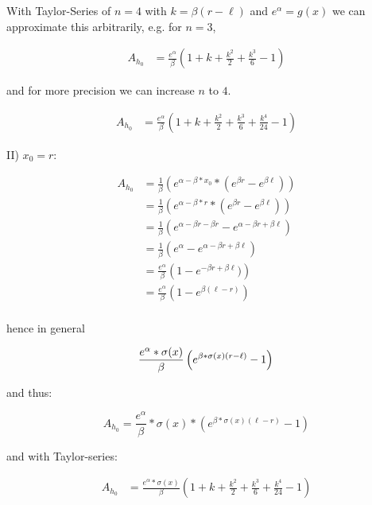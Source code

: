 With Taylor-Series of $n = 4$ with $k = \beta (r - \ell)$ and $e^{\alpha} = g(x)$ we can approximate this arbitrarily,
e.g. for $n = 3$,

\begin{align*}
	A_{h_0} &= \frac{e^{\alpha}}{\beta} \left(1 + k + \frac{k^2}{2} +  \frac{k^3}{6} - 1 \right)
\end{align*}

and for more precision we can increase $n$ to $4$.

\begin{align*}
	A_{h_0} &= \frac{e^{\alpha}}{\beta} \left(1 + k + \frac{k^2}{2} +  \frac{k^3}{6} + \frac{k^4}{24} - 1 \right)
\end{align*}


II) $x_0 = r$:

\begin{align*}
	A_{h_0} &= \frac{1}{\beta} \left( e^{\alpha - \beta * x_0} * \left(e^{\beta r} - e^{\beta \ell} \right) \right) \\
	&= \frac{1}{\beta} \left( e^{\alpha - \beta * r} * \left(e^{\beta r} - e^{\beta \ell} \right) \right) \\
	&= \frac{1}{\beta} \left(e^{\alpha - \beta r - \beta r} - e^{\alpha - \beta r + \beta \ell} \right) \\
	&= \frac{1}{\beta} \left(e^{\alpha} - e^{\alpha - \beta r + \beta \ell} \right) \\
	&= \frac{e^{\alpha}}{\beta} \left(1 - e^{- \beta r + \beta \ell} ) \right) \\
	&= \frac{e^{\alpha}}{\beta} \left(1 - e^{\beta (\ell - r)}  \right) \\
\end{align*}

hence in general

\[
	\frac{e^{\alpha} * \sigma(x)}{\beta} \left(e^{\beta * \sigma(x) (r - \ell)} - 1 \right) \\
\]

and thus:

\[
	A_{h_0} = \frac{e^{\alpha}}{\beta} * \sigma(x) * \left(e^{\beta * \sigma(x) (\ell - r)} - 1 \right)
\]

and with Taylor-series:

\begin{align*}
	A_{h_0} &= \frac{e^{\alpha} * \sigma(x)}{\beta} \left(1 + k + \frac{k^2}{2} +  \frac{k^3}{6} + \frac{k^4}{24} - 1 \right)
\end{align*}

